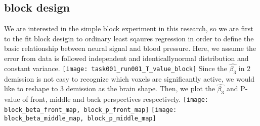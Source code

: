 \subsection{block design}
We are interested in the simple block experiment in this research, so we are 
first to the fit block desigin to ordinary least sqaures regression in order to
define the basic relationship between neural signal and blood pressure. Here, 
we assume the error from data is followed independent and identicallynormal
distribution and constant variance.
\texttt{[image: task001\_run001\_T\_value\_block]}
\label{T-value of $\hat{\beta_{3}}$ in block design OLS}
Since the $\hat{\beta_{3}}$ in 2 demission is not easy to recognize which voxels
are significantly active, we would like to reshape to 3 demission as the brain 
shape. Then, we plot the $\hat{\beta_{3}}$ and P-value of front, middle and 
back perspectives respectively.
\texttt{[image: block\_beta\_front\_map, block\_p\_front\_map]}
\label{Front perspective of brain in block design}
\texttt{[image: block\_beta\_middle\_map, block\_p\_middle\_map]}
\label{Middle perspective of brain in block design}





